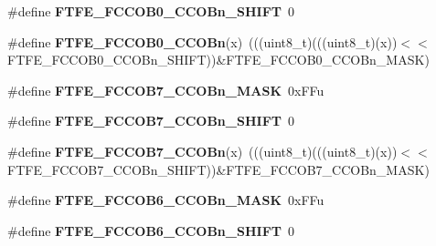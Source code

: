 \begin{DoxyCompactItemize}
\item 
\#define {\bfseries F\+T\+F\+E\+\_\+\+F\+C\+C\+O\+B0\+\_\+\+C\+C\+O\+Bn\+\_\+\+S\+H\+I\+FT}~0\hypertarget{group__FTFE__Register__Masks_gadb81c85946e5b09d2a0a47521b4e2f04}{}\label{group__FTFE__Register__Masks_gadb81c85946e5b09d2a0a47521b4e2f04}

\item 
\#define {\bfseries F\+T\+F\+E\+\_\+\+F\+C\+C\+O\+B0\+\_\+\+C\+C\+O\+Bn}(x)~(((uint8\+\_\+t)(((uint8\+\_\+t)(x))$<$$<$F\+T\+F\+E\+\_\+\+F\+C\+C\+O\+B0\+\_\+\+C\+C\+O\+Bn\+\_\+\+S\+H\+I\+FT))\&F\+T\+F\+E\+\_\+\+F\+C\+C\+O\+B0\+\_\+\+C\+C\+O\+Bn\+\_\+\+M\+A\+SK)\hypertarget{group__FTFE__Register__Masks_gaaaa890e477149e64e0a8168cf1b06fbe}{}\label{group__FTFE__Register__Masks_gaaaa890e477149e64e0a8168cf1b06fbe}

\item 
\#define {\bfseries F\+T\+F\+E\+\_\+\+F\+C\+C\+O\+B7\+\_\+\+C\+C\+O\+Bn\+\_\+\+M\+A\+SK}~0x\+F\+Fu\hypertarget{group__FTFE__Register__Masks_ga6f03287a2909b3e7fa73cc115291fec7}{}\label{group__FTFE__Register__Masks_ga6f03287a2909b3e7fa73cc115291fec7}

\item 
\#define {\bfseries F\+T\+F\+E\+\_\+\+F\+C\+C\+O\+B7\+\_\+\+C\+C\+O\+Bn\+\_\+\+S\+H\+I\+FT}~0\hypertarget{group__FTFE__Register__Masks_ga4b685969e78b9b85e14c8bf4561daf21}{}\label{group__FTFE__Register__Masks_ga4b685969e78b9b85e14c8bf4561daf21}

\item 
\#define {\bfseries F\+T\+F\+E\+\_\+\+F\+C\+C\+O\+B7\+\_\+\+C\+C\+O\+Bn}(x)~(((uint8\+\_\+t)(((uint8\+\_\+t)(x))$<$$<$F\+T\+F\+E\+\_\+\+F\+C\+C\+O\+B7\+\_\+\+C\+C\+O\+Bn\+\_\+\+S\+H\+I\+FT))\&F\+T\+F\+E\+\_\+\+F\+C\+C\+O\+B7\+\_\+\+C\+C\+O\+Bn\+\_\+\+M\+A\+SK)\hypertarget{group__FTFE__Register__Masks_ga842ed7bdaf4e63c178972f9687e478d5}{}\label{group__FTFE__Register__Masks_ga842ed7bdaf4e63c178972f9687e478d5}

\item 
\#define {\bfseries F\+T\+F\+E\+\_\+\+F\+C\+C\+O\+B6\+\_\+\+C\+C\+O\+Bn\+\_\+\+M\+A\+SK}~0x\+F\+Fu\hypertarget{group__FTFE__Register__Masks_ga5143a0f11e338ce6e900d67a58e9ce55}{}\label{group__FTFE__Register__Masks_ga5143a0f11e338ce6e900d67a58e9ce55}

\item 
\#define {\bfseries F\+T\+F\+E\+\_\+\+F\+C\+C\+O\+B6\+\_\+\+C\+C\+O\+Bn\+\_\+\+S\+H\+I\+FT}~0\hypertarget{group__FTFE__Register__Masks_ga5271e588fb67a85b91f350cd6e15e3d4}{}\label{group__FTFE__Register__Masks_ga5271e588fb67a85b91f350cd6e15e3d4}


\end{DoxyCompactItemize}
